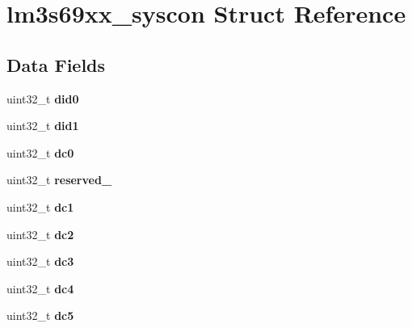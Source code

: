 \hypertarget{structlm3s69xx__syscon}{}\section{lm3s69xx\+\_\+syscon Struct Reference}
\label{structlm3s69xx__syscon}
\subsection*{Data Fields}
\begin{DoxyCompactItemize}
\item 
\mbox{\label{structlm3s69xx__syscon_ac2ce409a887f755eb0685a9f524229fb}} 
uint32\+\_\+t {\bfseries did0}
\item 
\mbox{\label{structlm3s69xx__syscon_ae3c5e17c6ef930bc51b178c6f3433fe5}} 
uint32\+\_\+t {\bfseries did1}
\item 
\mbox{\label{structlm3s69xx__syscon_a8272fcd44f7706044bd843629c8f89c6}} 
uint32\+\_\+t {\bfseries dc0}
\item 
\mbox{\label{structlm3s69xx__syscon_a4445771523947d930a833025374a1639}} 
uint32\+\_\+t {\bfseries reserved\+\_}
\item 
\mbox{\label{structlm3s69xx__syscon_af8194a26686a43a806dd6cb658e7b5f3}} 
uint32\+\_\+t {\bfseries dc1}
\item 
\mbox{\label{structlm3s69xx__syscon_a34ed2911d2130c51b39303e516b78e90}} 
uint32\+\_\+t {\bfseries dc2}
\item 
\mbox{\label{structlm3s69xx__syscon_aa4d070787179d394239eaa468b274042}} 
uint32\+\_\+t {\bfseries dc3}
\item 
\mbox{\label{structlm3s69xx__syscon_a9a6c1358f6247b4506f27afb9b1c619e}} 
uint32\+\_\+t {\bfseries dc4}
\item 
\mbox{\label{structlm3s69xx__syscon_a10ecdb8436dffa28a64d1f751e6a8ac6}} 
uint32\+\_\+t {\bfseries dc5}
\item 

\end{DoxyCompactItemize}
